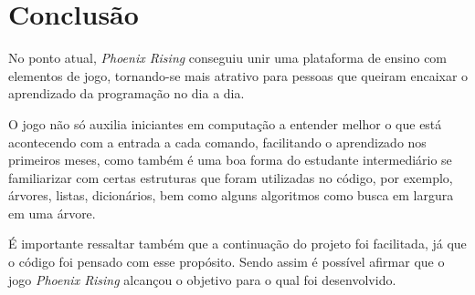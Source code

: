 \chapter{Conclusão}
\label{cap:Conclusão}

No ponto atual, \textit{Phoenix Rising} conseguiu unir uma plataforma de 
ensino com elementos de jogo, tornando-se mais atrativo para pessoas que
queiram encaixar o aprendizado da programação no dia a dia.

O jogo não só auxilia iniciantes em computação a entender melhor o que 
está acontecendo com a entrada a cada comando, facilitando o aprendizado 
nos primeiros meses, como também é uma boa forma do estudante intermediário 
se familiarizar com certas estruturas que foram utilizadas no código, por 
exemplo, árvores, listas, dicionários, bem como alguns algoritmos como busca
em largura em uma árvore.

É importante ressaltar também que a continuação do projeto foi facilitada, já 
que o código foi pensado com esse propósito. Sendo assim é possível afirmar que
o jogo \textit{Phoenix Rising} alcançou o objetivo para o qual foi
desenvolvido.